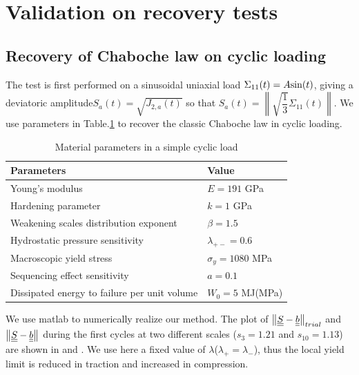 \clearpage
\section{Validation on recovery tests}
\label{sec:5.8}
\subsection{Recovery of Chaboche law on cyclic loading}
The test is first performed on a sinusoidal uniaxial load $\Sigma_{11}(t)=A\textnormal{sin}(t)$, giving a deviatoric amplitude$S_{a}(t)=\sqrt{J_{2,a}(t)}$  so that $S_{a}(t)=\left\| \sqrt{\dfrac{1}{3}}\Sigma_{11}(t)\right\| $. We use parameters in Table.\ref{tab:Sin} to recover the classic Chaboche law in cyclic loading.
\begin{table}[!h]
\centering
\begin{tabular}{ll}
\hline
\textbf{Parameters}                                         & \textbf{Value}                    \\ \hline
Young's modulus                                             & $E=191$ GPa                       \\
Hardening parameter                                         &  $k=1$ GPa \\
Weakening scales distribution exponent                      & $\beta=1.5$                             \\
Hydrostatic pressure sensitivity                            & $\lambda_{+-}=0.6$                     \\
Macroscopic yield stress                                    & $\sigma_y=1080$ MPa              \\
Sequencing effect sensitivity                               & $a=0.1$                        \\
Dissipated energy to failure per unit volume                & $W_0=5$ MJ(MPa)                       \\ \hline
\end{tabular}
\caption{Material parameters in a simple cyclic load }
\label{tab:Sin}
\end{table}

We use matlab to numerically realize our method. The plot of $\left\|  \uline{\uline{S}}-\uline{\uline{b}}\right\|_{trial}$ and $\left\|  \uline{\uline{S}}-\uline{\uline{b}}\right\|$ during the first cycles at two different scales ($s_{3}=1.21$ and $s_{10}=1.13$) are shown in  and . We use here a fixed value of $\lambda$($\lambda_+=\lambda_-$), thus the local yield limit is reduced in traction and increased
in compression.

